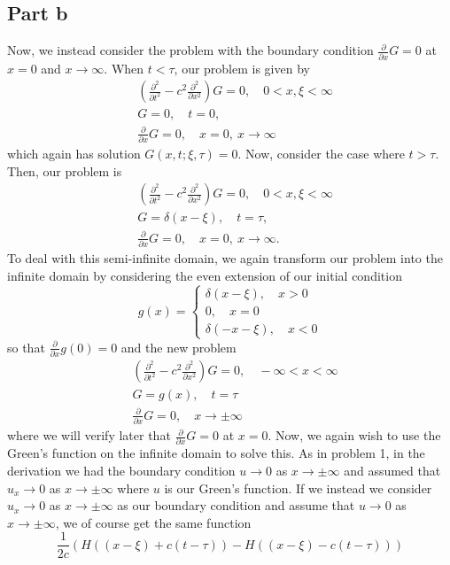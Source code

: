 \documentclass{article}
\begin{document}
\subsection{Part b}
Now, we instead consider the problem with the boundary condition $\frac{\partial}{\partial x}G=0$ at $x=0$ and $x\to\infty$. When $t<\tau$, our problem is given by
\begin{align*}
	&\left(\frac{\partial^2}{\partial t^2}-c^2\frac{\partial^2}{\partial x^2}\right)G=0, \quad 0<x,\xi<\infty\\
	&G=0, \quad t=0,\\
	&\frac{\partial}{\partial x}G=0, \quad x=0,~x\to\infty
\end{align*}
which again has solution $G(x,t;\xi,\tau)=0$. Now, consider the case where $t>\tau$. Then, our problem is
\begin{align*}
	&\left(\frac{\partial^2}{\partial t^2}-c^2\frac{\partial^2}{\partial x^2}\right)G=0, \quad 0<x,\xi<\infty\\
	&G=\delta(x-\xi), \quad t=\tau,\\
	&\frac{\partial}{\partial x}G=0, \quad x=0,~x\to\infty.
\end{align*}
To deal with this semi-infinite domain, we again transform our problem into the infinite domain by considering the even extension of our initial condition 
\[
g(x)=\begin{cases}
	\delta(x-\xi), \quad x>0\\
	0, \quad x=0\\
	\delta(-x-\xi), \quad x<0
\end{cases}
\]
so that $\frac{\partial}{\partial x}g(0)=0$ and the new problem
\begin{align*}
	&\left(\frac{\partial^2}{\partial t^2}-c^2\frac{\partial^2}{\partial x^2}\right)G=0, \quad -\infty<x<\infty\\
	&G=g(x), \quad t=\tau\\
	&\frac{\partial}{\partial x}G=0, \quad x\to\pm\infty
\end{align*}
where we will verify later that $\frac{\partial}{\partial x}G=0$ at $x=0$. Now, we again wish to use the Green's function on the infinite domain to solve this. As in problem 1, in the derivation we had the boundary condition $u\to0$ as $x\to\pm\infty$ and assumed that $u_x\to0$ as $x\to\pm\infty$ where $u$ is our Green's function. If we instead we consider $u_x\to0$ as $x\to\pm\infty$ as our boundary condition and assume that $u\to0$ as $x\to\pm\infty$, we of course get the same function 
\[
\frac{1}{2c}\left(H((x-\xi)+c(t-\tau))-H((x-\xi)-c(t-\tau))\right)
\]
\end{document}
